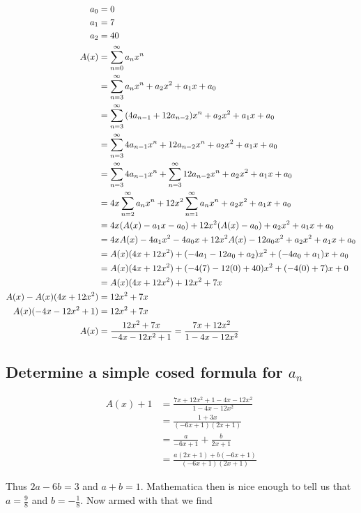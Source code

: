 \documentclass{article}
\theoremstyle{definition}
\begin{document}
	\def\tail{a_2x^2 + a_1x+a_0}
	
	\begin{align*}
		a_0 &= 0 \\ a_1 &= 7 \\ a_2 &= 40 \\
		A(x) &= \sumfrom{n=0}{\infty}{a_nx^n} \\
		&= \sumfrom{n=3}{\infty}{a_nx^n} + \tail \\
		&= \sumfrom{n=3}{\infty}{(4a_{n-1}+12a_{n-2})x^n} + \tail \\
		&= \sumfrom{n=3}{\infty}{4a_{n-1}x^n + 12a_{n-2}x^n} + \tail \\
		&= \sumfrom{n=3}{\infty}{4a_{n-1}x^n}+\sumfrom{n=3}{\infty}{12a_{n-2}x^n} + \tail \\
		&= 4x\sumfrom{n=2}{\infty}{a_nx^n} + 12x^2\sumfrom{n=1}{\infty}{a_nx^n} + \tail \\
		&= 4x(A(x) - a_1x - a_0) + 12x^2(A(x) - a_0) + \tail \\
		&= 4xA(x) - 4a_1x^2 - 4a_0x + 12x^2A(x) - 12a_0x^2 + \tail \\
		&= A(x)(4x+12x^2) + (-4a_1-12a_0+a_2)x^2+(-4a_0+a_1)x+a_0 \\
		&= A(x)(4x + 12x^2) + (-4(7)-12(0)+40)x^2+(-4(0)+7)x+0 \\
		&= A(x)(4x + 12x^2) + 12x^2 + 7x \\
		A(x) - A(x)(4x+12x^2) &= 12x^2 + 7x\\
		A(x)(-4x-12x^2+1) &= 12x^2+7x \\
		A(x) &= \frac{12x^2+7x}{-4x-12x^2+1} = \frac{7x+12x^2}{1-4x-12x^2}
	\end{align*}
	
	\subsection{Determine a simple cosed formula for $a_n$}
	
	\begin{align*}
		A(x) + 1 &= \frac{7x+12x^2 + 1 -4x-12x^2}{1-4x-12x^2} \\
		&= \frac{1+3x}{(-6x+1)(2x+1)} \\
		&= \frac a{-6x+1} + \frac b{2x+1} \\
		&= \frac {a(2x+1) + b(-6x+1)}{(-6x+1)(2x+1)}
	\end{align*}
	
	Thus $2a - 6b = 3$ and $a + b = 1$. Mathematica then is nice enough to tell us that $a = \frac98$ and $b = -\frac18$. Now armed with that we find
	
\end{document}
